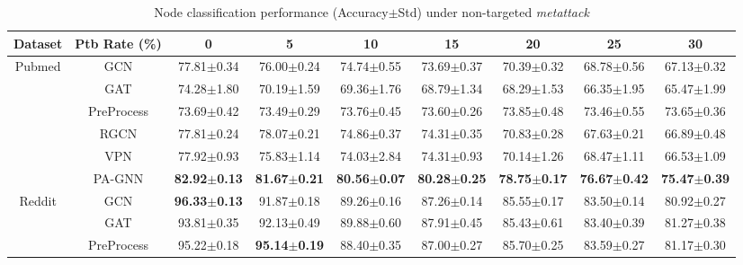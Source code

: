 \documentclass[sigconf]{acmart}
\newcommand{\our}{{PA-GNN}\xspace}
\begin{document}
\begin{table*}[!t]
\small
    \setlength{\tabcolsep}{8pt}
    \caption{Node classification performance (Accuracy$\pm$Std) under non-targeted \textit{metattack} \cite{zugner2018adversarial2}}\label{tab:nontarget}
    \vspace{-1.5em}
\centering
    \begin{tabular}{c|c|ccccccc}
\hline \hline
              Dataset      & Ptb Rate (\%)        & 0              & 5              & 10             & 15             & 20             & 25             & 30             \\ \hline
\multirow{6}{*}{Pubmed}     & GCN                  & 77.81$\pm$0.34 & 76.00$\pm$0.24 & 74.74$\pm$0.55 & 73.69$\pm$0.37 & 70.39$\pm$0.32 & 68.78$\pm$0.56 & 67.13$\pm$0.32 \\
                            & GAT                  & 74.28$\pm$1.80 & 70.19$\pm$1.59 & 69.36$\pm$1.76 & 68.79$\pm$1.34 & 68.29$\pm$1.53 & 66.35$\pm$1.95 & 65.47$\pm$1.99 \\
                            & PreProcess           & 73.69$\pm$0.42 & 73.49$\pm$0.29 & 73.76$\pm$0.45 & 73.60$\pm$0.26 & 73.85$\pm$0.48 & 73.46$\pm$0.55 & 73.65$\pm$0.36 \\
                            & RGCN                 & 77.81$\pm$0.24 & 78.07$\pm$0.21 & 74.86$\pm$0.37 & 74.31$\pm$0.35 & 70.83$\pm$0.28 & 67.63$\pm$0.21 & 66.89$\pm$0.48 \\
                            & VPN              & 77.92$\pm$0.93 & 75.83$\pm$1.14 & 74.03$\pm$2.84 & 74.31$\pm$0.93 & 70.14$\pm$1.26 & 68.47$\pm$1.11 & 66.53$\pm$1.09 \\
                            & \our & \textbf{82.92$\pm$0.13} & \textbf{81.67$\pm$0.21} & \textbf{80.56$\pm$0.07} & \textbf{80.28$\pm$0.25} & \textbf{78.75$\pm$0.17} & \textbf{76.67$\pm$0.42} & \textbf{75.47$\pm$0.39} \\
                            \hline
\multirow{6}{*}{Reddit}     & GCN                  & \textbf{96.33$\pm$0.13} & 91.87$\pm$0.18 & 89.26$\pm$0.16 & 87.26$\pm$0.14 & 85.55$\pm$0.17 & 83.50$\pm$0.14 & 80.92$\pm$0.27 \\
                            & GAT                  & 93.81$\pm$0.35 & 92.13$\pm$0.49 & 89.88$\pm$0.60 & 87.91$\pm$0.45 & 85.43$\pm$0.61 & 83.40$\pm$0.39 & 81.27$\pm$0.38 \\
                            & PreProcess           & 95.22$\pm$0.18 & \textbf{95.14$\pm$0.19} & 88.40$\pm$0.35 & 87.00$\pm$0.27 & 85.70$\pm$0.25 & 83.59$\pm$0.27 & 81.17$\pm$0.30 \\

\end{tabular}
\end{table*}
\end{document}

